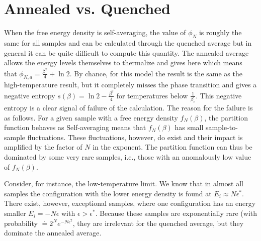 \documentclass[letterpaper,english,10pt]{article}
\begin{document}
\section{Annealed vs. Quenched}
When the free energy density is self-averaging, the value of $\phi_N$ is roughly the same for all samples and can be calculated through the quenched average
but in general it can be quite difficult to compute this quantity. 
The annealed average
allows the energy levels themselves to thermalize and gives here
which means that $\phi_{N,a} = \frac{\beta^2}{4}+\ln2$. 
By chance, for this model the result is the same as the high-temperature result, but it completely misses the phase transition and gives a negative entropy $s(\beta) = \ln2-\frac{\beta^2}{4}$ for temperatures below $\frac{1}{\beta_c}$.  
This negative entropy is a clear signal of failure of the calculation. 
The reason for the failure is as follows. 
For a given sample with a free energy density $f_N (\beta)$, the partition function behaves as 
Self-averaging means that $f_N(\beta)$ has small sample-to-sample fluctuations. 
These fluctuations, however, do exist and their impact is amplified by the factor of $N$ in the exponent. The partition function can thus be dominated by some very rare samples, i.e., those with an anomalously low value of $f_N(\beta)$. 

Consider, for instance, the low-temperature limit. 
We know that in almost all samples the configuration with the lower energy density is found at $E_i \approx N\epsilon^\ast$. 
There exist, however, exceptional samples, where one configuration has an energy smaller $E_i = -N\epsilon$ with $\epsilon > \epsilon^\ast$. 
Because these samples are exponentially rare (with probability $\stackrel{\cdot}{=}2^Ne^{-N\epsilon^2}$, they are irrelevant for the quenched average, but they dominate the annealed average.
\appendix
\end{document}
